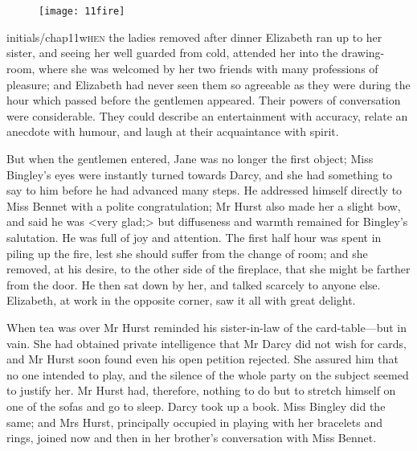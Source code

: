 \chapter[Chapter \thechapter]{}
	
	\begin{figure}[th!]
\centering
\texttt{[image: 11fire]}
\end{figure}

	\lettrine[lines=6,image=true]{initials/chap11w}{hen}  the ladies removed after dinner Elizabeth ran up to her sister, and seeing her well guarded from cold, attended her into the drawing-room, where she was welcomed by her two friends with many professions of pleasure; and Elizabeth had never seen them so agreeable as they were during the hour which passed before the gentlemen appeared. Their powers of conversation were considerable. They could describe an entertainment with accuracy, relate an anecdote with humour, and laugh at their acquaintance with spirit.

But when the gentlemen entered, Jane was no longer the first object; Miss Bingley's eyes were instantly turned towards Darcy, and she had something to say to him before he had advanced many steps. He addressed himself directly to Miss Bennet with a polite congratulation; Mr Hurst also made her a slight bow, and said he was <very glad;> but diffuseness and warmth remained for Bingley's salutation. He was full of joy and attention. The first half hour was spent in piling up the fire, lest she should suffer from the change of room; and she removed, at his desire, to the other side of the fireplace, that she might be farther from the door. He then sat down by her, and talked scarcely to anyone else. Elizabeth, at work in the opposite corner, saw it all with great delight.


When tea was over Mr Hurst reminded his sister-in-law of the card-table—but in vain. She had obtained private intelligence that Mr Darcy did not wish for cards, and Mr Hurst soon found even his open petition rejected. She assured him that no one intended to play, and the silence of the whole party on the subject seemed to justify her. Mr Hurst had, therefore, nothing to do but to stretch himself on one of the sofas and go to sleep. Darcy took up a book. Miss Bingley did the same; and Mrs Hurst, principally occupied in playing with her bracelets and rings, joined now and then in her brother's conversation with Miss Bennet.

